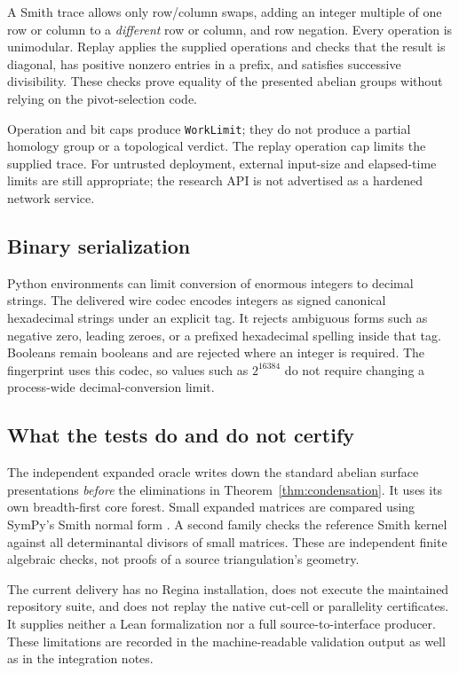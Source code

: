 \documentclass[11pt]{article}
\theoremstyle{definition}
\theoremstyle{remark}
\newcommand{\code}[1]{\texttt{#1}}
\begin{document}
A Smith trace allows only row/column swaps, adding an integer multiple of
one row or column to a \emph{different} row or column, and row negation.
Every operation is unimodular. Replay applies the supplied operations and
checks that the result is diagonal, has positive nonzero entries in a
prefix, and satisfies successive divisibility. These checks prove equality
of the presented abelian groups without relying on the pivot-selection code.

Operation and bit caps produce \code{WorkLimit}; they do not produce a
partial homology group or a topological verdict. The replay operation cap
limits the supplied trace. For untrusted deployment, external input-size
and elapsed-time limits are still appropriate; the research API is not
advertised as a hardened network service.

\subsection{Binary serialization}
Python environments can limit conversion of enormous integers to decimal
strings. The delivered wire codec encodes integers as signed canonical
hexadecimal strings under an explicit tag. It rejects ambiguous forms such
as negative zero, leading zeroes, or a prefixed hexadecimal spelling inside
that tag. Booleans remain booleans and are rejected where an integer is
required. The fingerprint uses this codec, so values such as $2^{16384}$ do
not require changing a process-wide decimal-conversion limit.

\subsection{What the tests do and do not certify}
The independent expanded oracle writes down the standard abelian surface
presentations \emph{before} the eliminations in Theorem~\ref{thm:condensation}.
It uses its own breadth-first core forest. Small expanded matrices are
compared using SymPy's Smith normal form \cite{sympy}. A second family
checks the reference Smith kernel against all determinantal divisors of
small matrices. These are independent finite algebraic checks, not proofs
of a source triangulation's geometry.

The current delivery has no Regina installation, does not execute the
maintained repository suite, and does not replay the native cut-cell or
parallelity certificates. It supplies neither a Lean formalization nor a
full source-to-interface producer. These limitations are recorded in the
machine-readable validation output as well as in the integration notes.
\end{document}
